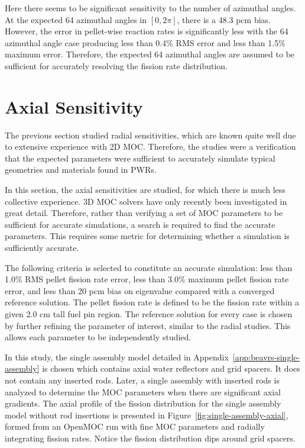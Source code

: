 Here there seems to be significant sensitivity to the number of azimuthal angles. At the expected 64 azimuthal angles in $[0, 2\pi]$, there is a 48.3 pcm bias. However, the error in pellet-wise reaction rates is significantly less with the 64 azimuthal angle case producing less than 0.4\% \ac{RMS} error and less than 1.5\% maximum error. Therefore, the expected 64 azimuthal angles are assumed to be sufficient for accurately resolving the fission rate distribution. 

\section{Axial Sensitivity}
\label{sec:axial-sensitivity}

The previous section studied radial sensitivities, which are known quite well due to extensive experience with 2D \ac{MOC}. Therefore, the studies were a verification that the expected parameters were sufficient to accurately simulate typical geometries and materials found in \acp{PWR}. 

In this section, the axial sensitivities are studied, for which there is much less collective experience. 3D \ac{MOC} solvers have only recently been investigated in great detail. Therefore, rather than verifying a set of \ac{MOC} parameters to be sufficient for accurate simulations, a search is required to find the accurate parameters. This requires some metric for determining whether a simulation is sufficiently accurate.

The following criteria is selected to constitute an accurate simulation: less than 1.0\% \ac{RMS} pellet fission rate error, less than 3.0\% maximum pellet fission rate error, and less than 20 pcm bias on eigenvalue compared with a converged reference solution. The pellet fission rate is defined to be the fission rate within a given 2.0 cm tall fuel pin region. The reference solution for every case is chosen by further refining the parameter of interest, similar to the radial studies. This allows each parameter to be independently studied.

In this study, the single assembly model detailed in Appendix~\ref{app:beavrs-single-assembly} is chosen which contains axial water reflectors and grid spacers. It does not contain any inserted rods. Later, a single assembly with inserted rods is analyzed to determine the \ac{MOC} parameters when there are significant axial gradients. The axial profile of the fission distribution for the single assembly model without rod insertions is presented in Figure~\ref{fig:single-assembly-axial}, formed from an OpenMOC run with fine \ac{MOC} parameters and radially integrating fission rates. Notice the fission distribution dips around grid spacers.

